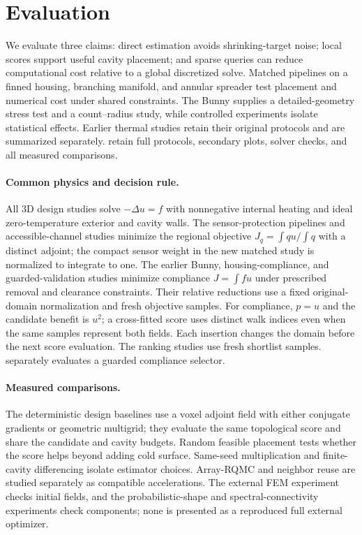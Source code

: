 \section{Evaluation}
\label{sec:results}

We evaluate three claims: direct estimation avoids shrinking-target noise; local scores support useful cavity placement; and sparse queries can reduce computational cost relative to a global discretized solve. Matched pipelines on a finned housing, branching manifold, and annular spreader test placement and numerical cost under shared constraints. The Bunny supplies a detailed-geometry stress test and a count--radius study, while controlled experiments isolate statistical effects. Earlier thermal studies retain their original protocols and are summarized separately.  retain full protocols, secondary plots, solver checks, and all measured comparisons.

\paragraph{Common physics and decision rule.}
All 3D design studies solve $-\Delta u=f$ with nonnegative internal heating and ideal zero-temperature exterior and cavity walls. The sensor-protection pipelines and accessible-channel studies minimize the regional objective $J_q=\int qu/\int q$ with a distinct adjoint; the compact sensor weight in the new matched study is normalized to integrate to one. The earlier Bunny, housing-compliance, and guarded-validation studies minimize compliance $J=\int fu$ under prescribed removal and clearance constraints. Their relative reductions use a fixed original-domain normalization and fresh objective samples. For compliance, $p=u$ and the candidate benefit is $u^2$; a cross-fitted score uses distinct walk indices even when the same samples represent both fields. Each insertion changes the domain before the next score evaluation. The ranking studies use fresh shortlist samples.  separately evaluates a guarded compliance selector.

\paragraph{Measured comparisons.}
The deterministic design baselines use a voxel adjoint field with either conjugate gradients or geometric multigrid; they evaluate the same topological score and share the candidate and cavity budgets. Random feasible placement tests whether the score helps beyond adding cold surface. Same-seed multiplication and finite-cavity differencing isolate estimator choices. Array-RQMC and neighbor reuse are studied separately as compatible accelerations. The external FEM experiment checks initial fields, and the probabilistic-shape and spectral-connectivity experiments check components; none is presented as a reproduced full external optimizer.

